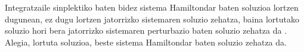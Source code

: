 Integratzaile sinplektiko baten bidez sistema Hamiltondar baten soluzioa lortzen dugunean, ez dugu lortzen jatorrizko sistemaren soluzio zehatza, baina lortutako soluzio hori bera jatorrizko sistemaren perturbazio baten soluzio zehatza da \cite{SSerna2015b}. Alegia, lortuta soluzioa, beste sistema Hamiltondar baten soluzio zehatza da.  




